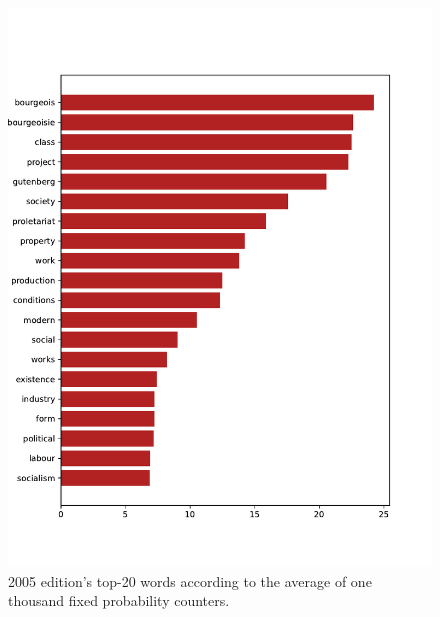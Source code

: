 \begin{figure}[!ht]
    \centering
    \includegraphics[width=0.9\linewidth]{figs/2005.epub-fixed-1000}
    \caption{2005 edition's top-20 words according to the average of one thousand fixed probability counters.}
    \label{fig:2005-20-fixed}
\end{figure}


